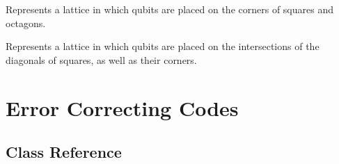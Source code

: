 \documentclass[letterpaper,10pt,english]{sphinxmanual}
\begin{document}

\begin{fulllineitems}
\label{lattice:py_qcode.SquareOctagonLattice}
Represents a lattice in which qubits are placed on the corners of squares and octagons.

\end{fulllineitems}


\begin{fulllineitems}
\label{lattice:py_qcode.UnionJackLattice}
Represents a lattice in which qubits are placed on the intersections of the diagonals of squares, as well as their corners.

\end{fulllineitems}



\chapter{Error Correcting Codes}
\label{code:error-correcting-codes}\label{code::doc}

\section{Class Reference}
\label{code:class-reference}
\end{document}
